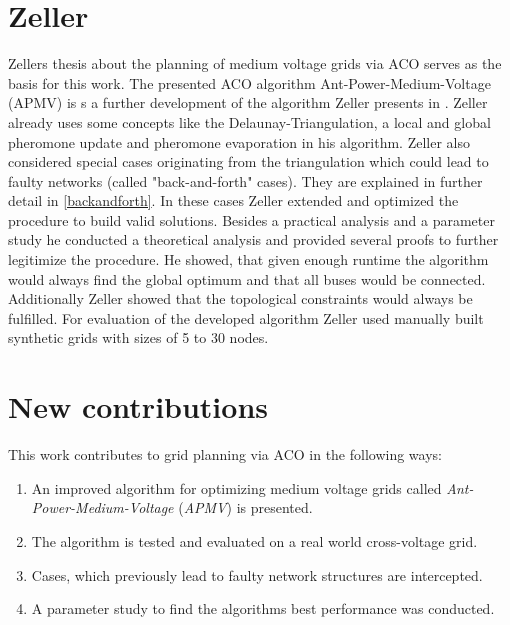 \section{Zeller}
Zellers thesis about the planning of medium voltage grids via ACO serves as the basis for this work. The presented ACO algorithm Ant-Power-Medium-Voltage (APMV) is s a further development of the algorithm Zeller presents in \cite{zeller2021planung}. Zeller already uses some concepts like the Delaunay-Triangulation, a local and global pheromone update and pheromone evaporation in his algorithm. Zeller also considered special cases originating from the triangulation which could lead to faulty networks (called "back-and-forth" cases). They are explained in further detail in \ref{backandforth}. In these cases Zeller extended and optimized the procedure to build valid solutions. Besides a practical analysis and a parameter study he conducted a theoretical analysis and provided several proofs to further legitimize the procedure. He showed, that given enough runtime the algorithm would always find the global optimum and that all buses would be connected. Additionally Zeller showed that the topological constraints would always be fulfilled. For evaluation of the developed algorithm Zeller used manually built synthetic grids with sizes of 5 to 30 nodes.

\newpage
\section{New contributions}
This work contributes to grid planning via ACO in the following ways:
\begin{enumerate}
	\setlength\itemsep{-0.5em}
	\item An improved algorithm for optimizing medium voltage grids called \textit{Ant-Power-Medium-Voltage} (\textit{APMV}) is presented.
	\item The algorithm is tested and evaluated on a real world cross-voltage grid.
	\item Cases, which previously lead to faulty network structures are intercepted.
	\item A parameter study to find the algorithms best performance was conducted.
\end{enumerate}

